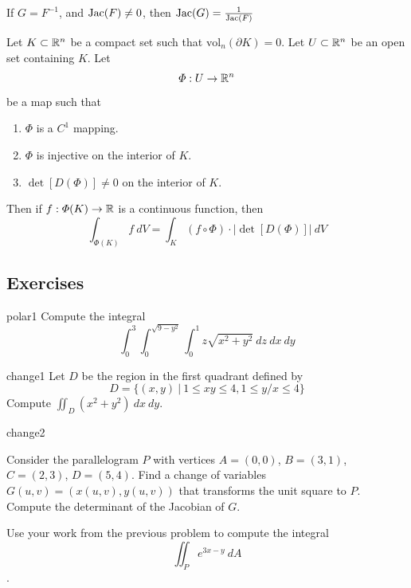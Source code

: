     \begin{theorem}
    If $G = F^{-1}$, and $\textnormal{Jac}(F) \neq 0$, then $\textnormal{Jac}(G) = \frac{1}{\textnormal{Jac}(F)}$
    \end{theorem}










    \begin{theorem}
    Let $K \subset \mathbb{R}^n$ be a compact set such that $\text{vol}_n(\partial K) = 0$.  Let $U \subset \mathbb{R}^n$ be an open set containing $K$. Let $$\Phi : U \to \mathbb{R}^n$$ be a map such that 
    \begin{enumerate}
        \item $\Phi$ is a $C^1$ mapping.
        \item $\Phi$ is injective on the interior of $K$.  
        \item $\det [D(\Phi)] \neq 0$ on the interior of $K$.  
    \end{enumerate}
    Then if $f: \Phi(K) \to \mathbb{R}$ is a continuous function, then 
    $$\int_{\Phi(K)} f \  dV = \int_K(f \circ \Phi) \cdot |\det [D(\Phi)]| \ dV$$
    \end{theorem}


    \subsection{Exercises}

    \begin{problem}{polar1}
    Compute the integral $$\int_0^3\int_0^{\sqrt{9-y^2}}\int_0^1 z\sqrt{x^2 + y^2} \ dz \ dx \ dy$$
\end{problem}

\begin{problem}{change1}
    Let $D$ be the region in the first quadrant defined by $$D = \{ (x,y) \ | \ 1 \leq xy \leq 4, 1 \leq y/x \leq 4 \}$$
    Compute $\iint_D (x^2 + y^2) \ dx \ dy$.
\end{problem}

\begin{problem}{change2}
    \begin{subproblems}
    \item Consider the parallelogram $P$ with vertices $A = (0,0)$, $B = (3,1)$, $C = (2,3)$, $D = (5,4)$.  Find a change of variables $G(u,v) = (x(u,v), y(u,v))$ that transforms the unit square to $P$.  Compute the determinant of the Jacobian of $G$.
    \item Use your work from the previous problem to compute the integral $$\iint_P e^{3x-y} \ dA$$.
    \end{subproblems}
    
\end{problem}

